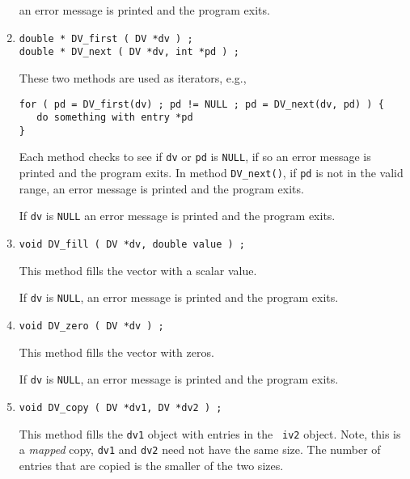 \begin{enumerate}
an error message is printed and the program exits.
\item
\begin{verbatim}
double * DV_first ( DV *dv ) ;
double * DV_next ( DV *dv, int *pd ) ;
\end{verbatim}
These two methods are used as iterators, e.g.,
\begin{verbatim}
for ( pd = DV_first(dv) ; pd != NULL ; pd = DV_next(dv, pd) ) {
   do something with entry *pd
}
\end{verbatim}
Each method checks to see if {\tt dv} or {\tt pd} is {\tt NULL},
if so an error message is printed and the program exits.
In method {\tt DV\_next()}, if {\tt pd} is not in the valid
range, an error message is printed and the program exits.
\par {}
If {\tt dv} is {\tt NULL}
an error message is printed and the program exits.
\item
\begin{verbatim}
void DV_fill ( DV *dv, double value ) ;
\end{verbatim}
This method fills the vector with a scalar value.
\par {}
If {\tt dv} is {\tt NULL},
an error message is printed and the program exits.
\item
\begin{verbatim}
void DV_zero ( DV *dv ) ;
\end{verbatim}
This method fills the vector with zeros.
\par {}
If {\tt dv} is {\tt NULL},
an error message is printed and the program exits.
\item
\begin{verbatim}
void DV_copy ( DV *dv1, DV *dv2 ) ;
\end{verbatim}
This method fills the {\tt dv1} object with entries in the {\tt
iv2} object.
Note, this is a {\it mapped} copy, {\tt dv1} and {\tt dv2} need not
have the same size.
The number of entries that are copied is the smaller of the two sizes.

\end{enumerate}
